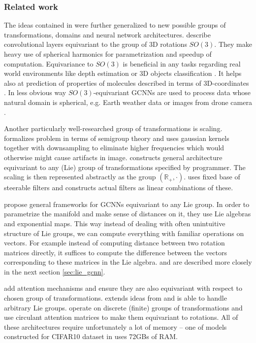 \subsubsection{Related work}
    The ideas contained in \cite{cohen2016} were further generalized to new
    possible groups of transformations, domains and neural network
    architectures. \cite{cohen_spherical_cnns, kondor_trivedi,
    esteves_so3} describe convolutional layers equivariant to
    the group of 3D rotations $\mathit{SO}(3)$.
    They make heavy use of spherical harmonics for parametrization and
    speedup of computation. Equivariance to $\mathit{SO}(3)$ is beneficial
    in any tasks regarding real world environments like depth estimation or 3D
    objects classification \cite{esteves_so3}. It helps also at
    prediction of properties of
    molecules described in terms of 3D-coordinates \cite{lieconv}.
    In less obvious way
    $\mathit{SO}(3)$-equivariant GCNNs are used to process data whose natural
    domain is spherical, e.g. Earth weather data or images from drone camera
    \cite{cohen_spherical_cnns}.

    Another particularly well-researched group of transformations is scaling.
    \cite{deep_scale_spaces} formalizes problem in terms of semigroup theory and
    uses gaussian kernels together with downsampling to eliminate higher
    frequencies which would otherwise might cause artifacts in image.
    \cite{bekkers2019} constructs general architecture equivariant to any (Lie) group
    of transformations specified by programmer. The scaling is then represented abstractly as
    the group $\left(\mathbb{R}_+,\cdot\right)$. \cite{scale_steerable} uses
    fixed base of steerable filters and constructs actual filters as linear
    combinations of these.


    \cite{bekkers2019, lieconv, lie_transformer} propose general frameworks for
    GCNNs equivariant to any Lie group. In order to parametrize the manifold and
    make sense of distances on it, they use Lie algebras and exponential maps.
    This way
    instead of dealing with often unintuitive structure of Lie groups, we can
    compute everything with familiar operations on vectors. For example
    instead of computing distance between two rotation matrices directly, it
    suffices to compute the difference between the vectors corresponding to
    these matrices in the Lie algebra. \cite{lieconv} and \cite{bekkers2019} are
    described more closely in the next section \ref{sec:lie_gcnn}.

    \cite{lie_transformer, attentive_gcnn, coattentive} add attention mechanisms
    and ensure they are also equivariant with respect to chosen group of
    transformations. \cite{lie_transformer} extends ideas from \cite{lieconv}
    and is able to handle arbitrary Lie groups.
    \cite{attentive_gcnn, coattentive} operate on discrete (finite) groups of
    transformations and use circulant attention matrices to make them
    equivariant to rotations. All of these architectures require unfortunately a
    lot of memory -- one of models constructed for CIFAR10 dataset in
    \cite{attentive_gcnn} uses 72GBs of RAM.

